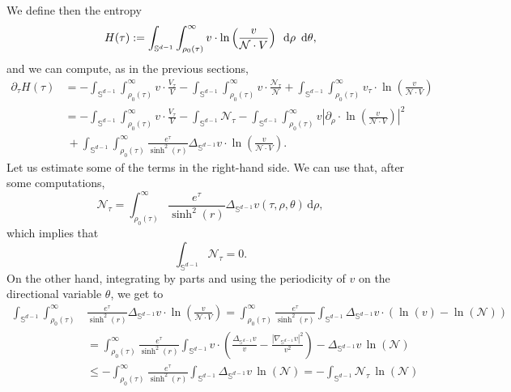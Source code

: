 \documentclass[12pt,longbibliography]{article}
\def\d{\,\mathrm{d}}
\def\d{\,\mathrm{d}}
\theoremstyle{definition}
\theoremstyle{remark}
\theoremstyle{example}
\begin{document}
We define then the entropy
\begin{equation}\label{eq:def_entropy_general_data}\notag
	H(\tau):= \int_{\mathbb{S}^{d-1}}\int_{\rho_0(\tau)}^\infty v\cdot\ln\left(\frac{v}{\mathcal{N}\cdot V}\right)\ \d \rho\ \d \theta,
\end{equation}
and we can compute, as in the previous sections,
\[
\begin{aligned}
	\partial_\tau H(\tau) & =  - \int_{\mathbb{S}^{d-1}}\int_{\rho_0(\tau)}^\infty v\cdot\frac{V_\tau}{V} - \int_{\mathbb{S}^{d-1}}\int_{\rho_0(\tau)}^\infty v\cdot\frac{\mathcal{N}_\tau}{\mathcal{N}}  + \int_{\mathbb{S}^{d-1}}\int_{\rho_0(\tau)}^\infty v_\tau \cdot\ln\left(\frac{v}{\mathcal{N}\cdot V}\right)\\[10pt]
	&=  - \int_{\mathbb{S}^{d-1}}\int_{\rho_0(\tau)}^\infty v\cdot\frac{V_\tau}{V} - \int_{\mathbb{S}^{d-1}}\mathcal{N}_\tau - \int_{\mathbb{S}^{d-1}}\int_{\rho_0(\tau)}^\infty v\left|\partial_\rho \cdot\ln\left(\frac{v}{\mathcal{N}\cdot V}\right)\right|^2\\[10pt]
	& \ + \int_{\mathbb{S}^{d-1}}\int_{\rho_0(\tau)}^\infty \frac{e^\tau}{\sinh^{2}(r)}\Delta_{\mathbb{S}^{d-1}}v \cdot\ln\left(\frac{v}{\mathcal{N}\cdot V}\right).
\end{aligned}
\]
Let us estimate some of the terms in the right-hand side. We can use that, after some computations,
\[
\mathcal{N}_\tau = \int_{\rho_0(\tau)}^\infty \frac{e^\tau}{\sinh^{2}(r)} \Delta_{\mathbb{S}^{d-1}}v(\tau, \rho, \theta) \d \rho,
\]
which implies that
\[
\int_{\mathbb{S}^{d-1}}\mathcal{N}_\tau=0.
\]
On the other hand, integrating by parts and using the periodicity of $v$ on the directional variable $\theta$, we get to
\[
\begin{aligned}
	\int_{\mathbb{S}^{d-1}}\int_{\rho_0(\tau)}^\infty& \frac{e^\tau}{\sinh^{2}(r)}\Delta_{\mathbb{S}^{d-1}}v \cdot\ln\left(\frac{v}{\mathcal{N}\cdot V}\right) = \int_{\rho_0(\tau)}^\infty \frac{e^\tau}{\sinh^{2}(r)}\int_{\mathbb{S}^{d-1}}\Delta_{\mathbb{S}^{d-1}}v \cdot (\ln\left(v\right) - \ln\left(\mathcal{N}\right))\\[10pt]
	& = \int_{\rho_0(\tau)}^\infty \frac{e^\tau}{\sinh^{2}(r)}\int_{\mathbb{S}^{d-1}}v \cdot \left(\frac{\Delta_{\mathbb{S}^{d-1}} v}{v} - \frac{|\nabla_{\mathbb{S}^{d-1}}v|^2}{v^2}\right) -\Delta_{\mathbb{S}^{d-1}}v\, \ln(\mathcal{N}) \\[10pt]
	& \leq -\int_{\rho_0(\tau)}^\infty \frac{e^\tau}{\sinh^{2}(r)}\int_{\mathbb{S}^{d-1}}\Delta_{\mathbb{S}^{d-1}}v\, \ln(\mathcal{N}) = -\int_{\mathbb{S}^{d-1}}\mathcal{N}_\tau\, \ln(\mathcal{N})  
\end{aligned}
\]
\end{document}
